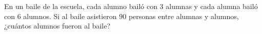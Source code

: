 En un baile de la escuela, cada alumno bailó con $3$ alumnas y cada alumna bailó con $6$ alumnos. Si al baile asistieron $90$ personas entre alumnas y alumnos, ¿cuántos alumnos fueron al baile?